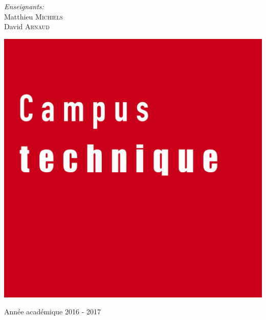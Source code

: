 \begin{center}
  \vspace{1.5cm}

  \begin{minipage}[t]{0.4 \textwidth}
    \begin{center} 
      \large \emph{Enseignants:} \\ 
      Matthieu \textsc{Michiels} \\
      David \textsc{Arnaud}
    \end{center} 
  \end{minipage}

  \vspace{1cm}

  \includegraphics[scale=0.08]{textures/logo/technical.pdf}

  \vspace{0.5cm}

  Année académique 2016 - 2017
\end{center}

\thispagestyle{empty}
